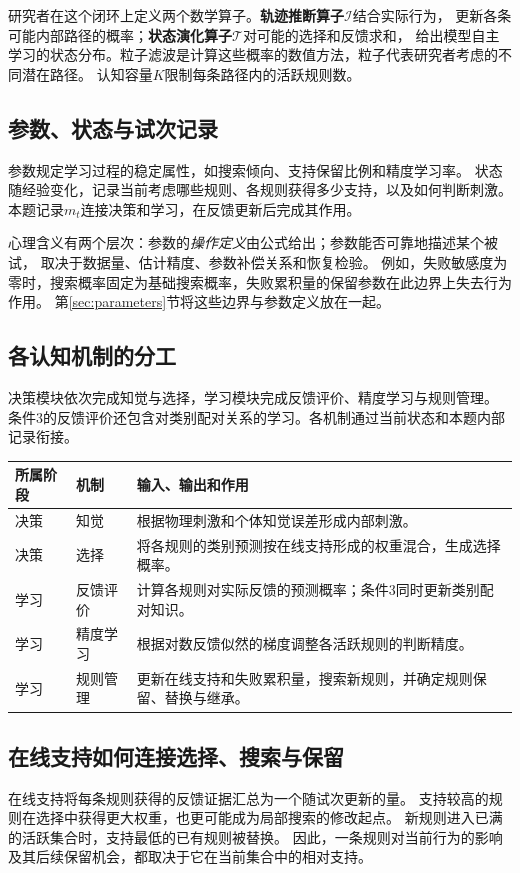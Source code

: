 \documentclass[11pt,a4paper]{article}
\numberwithin{equation}{section}
\newcommand{\Ii}{\mathcal{I}}
\newcommand{\Tt}{\mathcal{T}}
\begin{document}
研究者在这个闭环上定义两个数学算子。\textbf{轨迹推断算子}$\Ii$结合实际行为，
更新各条可能内部路径的概率；\textbf{状态演化算子}$\Tt$对可能的选择和反馈求和，
给出模型自主学习的状态分布。粒子滤波是计算这些概率的数值方法，粒子代表研究者考虑的不同潜在路径。
认知容量$K$限制每条路径内的活跃规则数。

\subsection{参数、状态与试次记录}
参数规定学习过程的稳定属性，如搜索倾向、支持保留比例和精度学习率。
状态随经验变化，记录当前考虑哪些规则、各规则获得多少支持，以及如何判断刺激。
本题记录$m_t$连接决策和学习，在反馈更新后完成其作用。

心理含义有两个层次：参数的\emph{操作定义}由公式给出；参数能否可靠地描述某个被试，
取决于数据量、估计精度、参数补偿关系和恢复检验。
例如，失败敏感度为零时，搜索概率固定为基础搜索概率，失败累积量的保留参数在此边界上失去行为作用。
第\ref{sec:parameters}节将这些边界与参数定义放在一起。

\subsection{各认知机制的分工}
决策模块依次完成知觉与选择，学习模块完成反馈评价、精度学习与规则管理。
条件3的反馈评价还包含对类别配对关系的学习。各机制通过当前状态和本题内部记录衔接。

{\small\noindent
\begin{tabularx}{\linewidth}{L{2.5cm}L{3.3cm}Y}
\toprule
所属阶段 & 机制 & 输入、输出和作用\\
\midrule
决策 & 知觉 & 根据物理刺激和个体知觉误差形成内部刺激。\\
决策 & 选择 & 将各规则的类别预测按在线支持形成的权重混合，生成选择概率。\\
学习 & 反馈评价 & 计算各规则对实际反馈的预测概率；条件3同时更新类别配对知识。\\
学习 & 精度学习 & 根据对数反馈似然的梯度调整各活跃规则的判断精度。\\
学习 & 规则管理 & 更新在线支持和失败累积量，搜索新规则，并确定规则保留、替换与继承。\\
\bottomrule
\end{tabularx}}

\subsection{在线支持如何连接选择、搜索与保留}
在线支持将每条规则获得的反馈证据汇总为一个随试次更新的量。
支持较高的规则在选择中获得更大权重，也更可能成为局部搜索的修改起点。
新规则进入已满的活跃集合时，支持最低的已有规则被替换。
因此，一条规则对当前行为的影响及其后续保留机会，都取决于它在当前集合中的相对支持。
\end{document}
